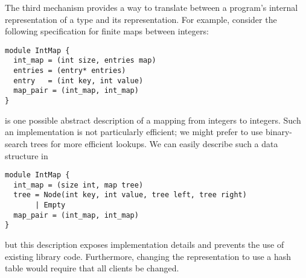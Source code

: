 The third mechanism provides a way to translate between a program's internal representation
of a type and its \asdl{} representation.
For example, consider the following \asdl{} specification for finite maps between
integers:
%
\begin{code}\begin{lstlisting}[language=ASDL]
module IntMap {
  int_map = (int size, entries map)
  entries = (entry* entries)
  entry   = (int key, int value)
  map_pair = (int_map, int_map)
}
\end{lstlisting}\end{code}%
%
is one possible abstract description of a mapping from integers to
integers.
Such an implementation is not particularly efficient; we might prefer to
use binary-search trees for more efficient lookups.
We can easily describe such a data structure in \asdl{}
\begin{code}\begin{lstlisting}[language=ASDL]
module IntMap {
  int_map = (size int, map tree)
  tree = Node(int key, int value, tree left, tree right)
       | Empty
  map_pair = (int_map, int_map)
}
\end{lstlisting}\end{code}%
but this description exposes implementation details and prevents the use
of existing library code.  Furthermore, changing the representation
to use a hash table would require that all clients be changed.

